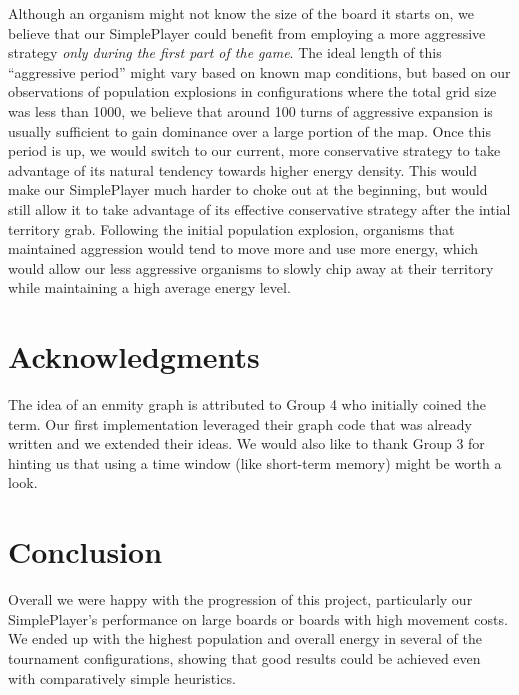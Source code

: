 \documentclass[
10pt, %
letterpaper, %
oneside, %
headinclude,footinclude, %
english
]{article}
\begin{document}
Although an organism might not know the size of the board it starts on, we believe that our SimplePlayer could benefit from employing a more aggressive strategy \textit{only during the first part of the game}. The ideal length of this ``aggressive period'' might vary based on known map conditions, but based on our observations of population explosions in configurations where the total grid size was less than 1000, we believe that around 100 turns of aggressive expansion is usually sufficient to gain dominance over a large portion of the map. Once this period is up, we would switch to our current, more conservative strategy to take advantage of its natural tendency towards higher energy density. This would make our SimplePlayer much harder to choke out at the beginning, but would still allow it to take advantage of its effective conservative strategy after the intial territory grab. Following the initial population explosion, organisms that maintained aggression would tend to move more and use more energy, which would allow our less aggressive organisms to slowly chip away at their territory while maintaining a high average energy level.

\section{Acknowledgments}

The idea of an enmity graph is attributed to Group 4 who initially coined the term. Our first implementation leveraged their graph code that was already written and we extended their ideas. We would also like to thank Group 3 for hinting us that using a time window (like short-term memory) might be worth a look.

\section{Conclusion}

Overall we were happy with the progression of this project, particularly our SimplePlayer's performance on large boards or boards with high movement costs. We ended up with the highest population and overall energy in several of the tournament configurations, showing that good results could be achieved even with comparatively simple heuristics.
\end{document}
